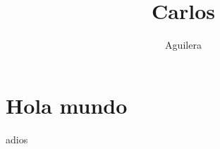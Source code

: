 \documentclass[a4paper]{article}
\title{Carlos}
\author{Aguilera}
\begin{document}
\section{Hola mundo}
adios
\end{document}
